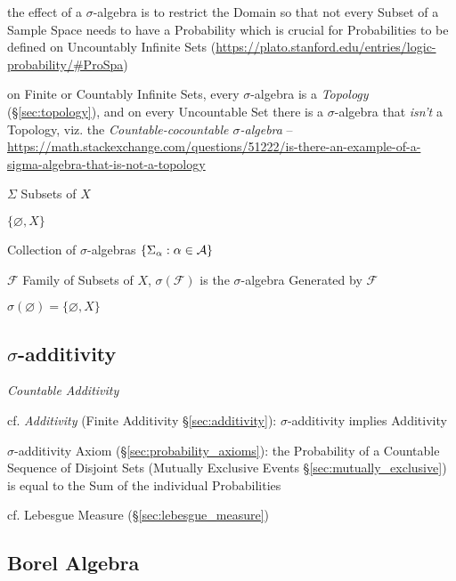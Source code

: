 the effect of a $\sigma$-algebra is to restrict the Domain so that not every
Subset of a Sample Space needs to have a Probability which is crucial for
Probabilities to be defined on Uncountably Infinite Sets
(\url{https://plato.stanford.edu/entries/logic-probability/#ProSpa})

\fist on Finite or Countably Infinite Sets, every $\sigma$-algebra is a
\emph{Topology} (\S\ref{sec:topology}), and on every Uncountable Set there is a
$\sigma$-algebra that \emph{isn't} a Topology, viz. the
\emph{Countable-cocountable $\sigma$-algebra}
--\url{https://math.stackexchange.com/questions/51222/is-there-an-example-of-a-sigma-algebra-that-is-not-a-topology}

$\Sigma$ Subsets of $X$

$\{ \varnothing, X \}$

Collection of $\sigma$-algebras $\{ \Sigma_\alpha : \alpha \in \mathcal{A} \}$

$\mathcal{F}$ Family of Subsets of $X$, $\sigma(\mathcal{F})$ is the
$\sigma$-algebra Generated by $\mathcal{F}$

$\sigma(\varnothing) = \{ \varnothing, X \}$



\subsection{$\sigma$-additivity}\label{sec:sigma_additivity}

\emph{Countable Additivity}

cf. \emph{Additivity} (Finite Additivity \S\ref{sec:additivity}):
$\sigma$-additivity implies Additivity

\fist $\sigma$-additivity Axiom (\S\ref{sec:probability_axioms}): the
Probability of a Countable Sequence of Disjoint Sets (Mutually Exclusive Events
\S\ref{sec:mutually_exclusive}) is equal to the Sum of the individual
Probabilities

cf. Lebesgue Measure (\S\ref{sec:lebesgue_measure})



\subsection{Borel Algebra}\label{sec:borel_algebra}

